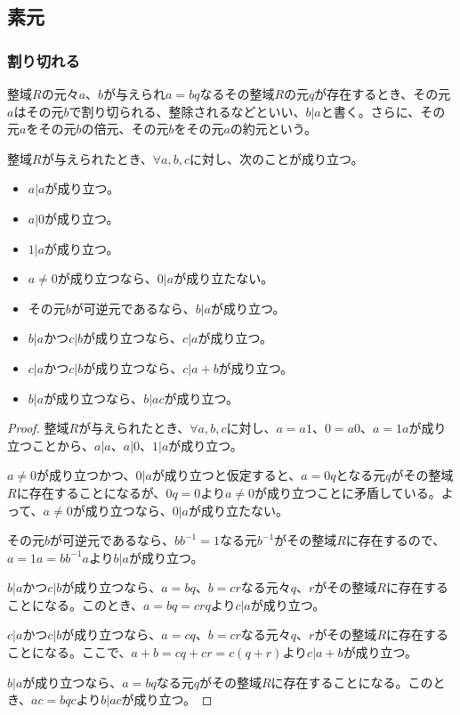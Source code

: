\documentclass[dvipdfmx]{jsarticle}
\begin{document}
\subsection{素元}%
\subsubsection{割り切れる}%
\begin{dfn}
整域$R$の元々$a$、$b$が与えられ$a = bq$なるその整域$R$の元$q$が存在するとき、その元$a$はその元$b$で割り切られる、整除されるなどといい、$b|a$と書く。さらに、その元$a$をその元$b$の倍元、その元$b$をその元$a$の約元という。
\end{dfn}
\begin{thm}\label{3.3.4.1}
整域$R$が与えられたとき、$\forall a,b,c$に対し、次のことが成り立つ。
\begin{itemize}
\item
  $a|a$が成り立つ。
\item
  $a|0$が成り立つ。
\item
  $1|a$が成り立つ。
\item
  $a \neq 0$が成り立つなら、$0|a$が成り立たない。
\item
  その元$b$が可逆元であるなら、$b|a$が成り立つ。
\item
  $b|a$かつ$c|b$が成り立つなら、$c|a$が成り立つ。
\item
  $c|a$かつ$c|b$が成り立つなら、$c|a + b$が成り立つ。
\item
  $b|a$が成り立つなら、$b|ac$が成り立つ。
\end{itemize}
\end{thm}
\begin{proof}
整域$R$が与えられたとき、$\forall a,b,c$に対し、$a = a1$、$0 = a0$、$a = 1a$が成り立つことから、$a|a$、$a|0$、$1|a$が成り立つ。\par
$a \neq 0$が成り立つかつ、$0|a$が成り立つと仮定すると、$a = 0q$となる元$q$がその整域$R$に存在することになるが、$0q = 0$より$a \neq 0$が成り立つことに矛盾している。よって、$a \neq 0$が成り立つなら、$0|a$が成り立たない。\par
その元$b$が可逆元であるなら、$bb^{-1} = 1$なる元$b^{-1}$がその整域$R$に存在するので、$a = 1a = bb^{-1}a $より$b|a$が成り立つ。\par
$b|a$かつ$c|b$が成り立つなら、$a = bq$、$b = cr$なる元々$q$、$r$がその整域$R$に存在することになる。このとき、$a = bq = crq$より$c|a$が成り立つ。\par
$c|a$かつ$c|b$が成り立つなら、$a = cq$、$b = cr$なる元々$q$、$r$がその整域$R$に存在することになる。ここで、$a + b = cq + cr = c(q + r)$より$c|a + b$が成り立つ。\par
$b|a$が成り立つなら、$a = bq$なる元$q$がその整域$R$に存在することになる。このとき、$ac = bqc$より$b|ac$が成り立つ。
\end{proof}
\end{document}
